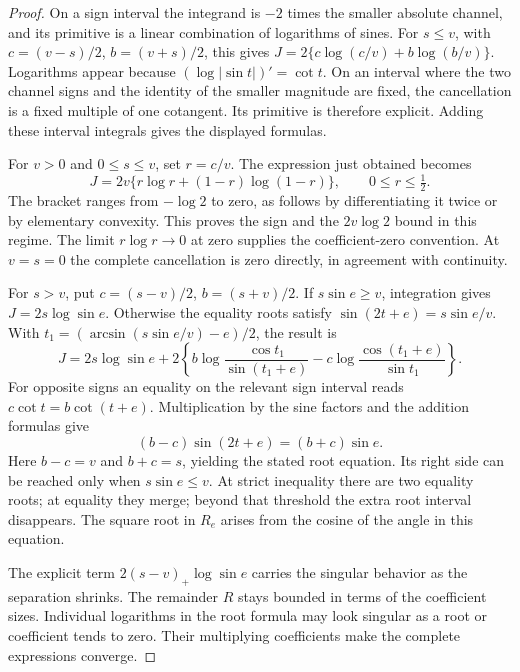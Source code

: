 \begin{proof}
On a sign interval the integrand is $-2$ times the smaller absolute
channel, and its primitive is a linear combination of logarithms of
sines. For $s\leq v$, with $c=(v-s)/2$, $b=(v+s)/2$, this gives
$J=2\{c\log(c/v)+b\log(b/v)\}$. Logarithms appear because $(\log|\sin t|)'=\cot t$. On an interval
where the two channel signs and the identity of the smaller magnitude
are fixed, the cancellation is a fixed multiple of one cotangent. Its
primitive is therefore explicit. Adding these interval integrals gives
the displayed formulas.

For $v>0$ and $0\leq s\leq v$, set $r=c/v$. The expression just obtained becomes
\[
 J=2v\{r\log r+(1-r)\log(1-r)\},\qquad 0\leq r\leq\tfrac12.
\]
The bracket ranges from $-\log2$ to zero, as follows by differentiating
it twice or by elementary convexity. This proves the sign and the
$2v\log2$ bound in this regime. The limit $r\log r\to0$ at zero
supplies the coefficient-zero convention. At $v=s=0$ the complete
cancellation is zero directly, in agreement with continuity.

For $s>v$, put
$c=(s-v)/2$, $b=(s+v)/2$. If $s\sin e\geq v$, integration gives
$J=2s\log\sin e$. Otherwise the equality roots satisfy
$\sin(2t+e)=s\sin e/v$. With
$t_1=(\arcsin(s\sin e/v)-e)/2$, the result is
\[
 J=2s\log\sin e+2\left\{
 b\log\frac{\cos t_1}{\sin(t_1+e)}
 -c\log\frac{\cos(t_1+e)}{\sin t_1}\right\}.
\]
For opposite signs an equality on the relevant sign interval reads
$c\cot t=b\cot(t+e)$. Multiplication by the sine factors and the
addition formulas give
\[
 (b-c)\sin(2t+e)=(b+c)\sin e.
\]
Here $b-c=v$ and $b+c=s$, yielding the stated root equation. Its
right side can be reached only when $s\sin e\leq v$. At strict
inequality there are two equality roots; at equality they merge; beyond
that threshold the extra root interval disappears. The square root in
$R_e$ arises from the cosine of the angle in this equation.

The explicit term $2(s-v)_+\log\sin e$ carries the singular behavior
as the separation shrinks. The remainder $R$ stays bounded in terms of
the coefficient sizes. Individual logarithms in the root formula may
look singular as a root or coefficient tends to zero. Their multiplying
coefficients make the complete expressions converge.


\end{proof}

